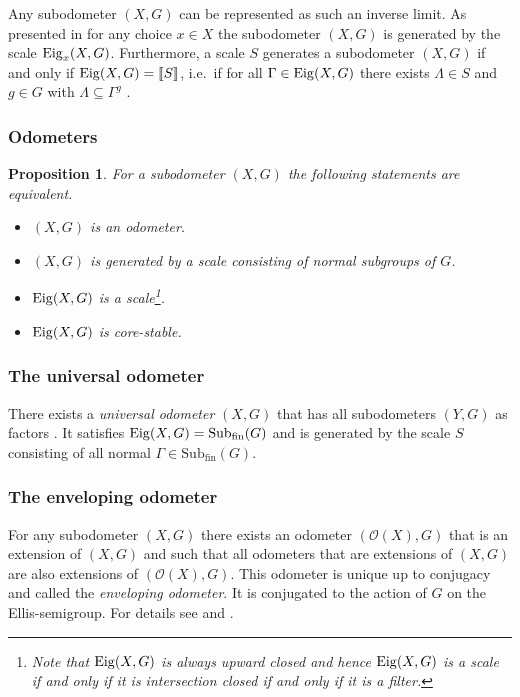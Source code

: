 \documentclass[12pt, reqno]{amsart}
\newtheorem{proposition}[theorem]{Proposition}
\theoremstyle{definition}
\theoremstyle{remark}
\numberwithin{equation}{section}
\theoremstyle{theorem}
\theoremstyle{remark}
\def\subfin{{\operatorname{Sub_{fin}}}}
\def\Eig{{\rm Eig}}
\newcommand{\envelopingOdometer}[1]{\mathcal{O}(#1)}
\newcommand{\eigenhull}[1]{\left\llbracket #1 \right\rrbracket}
\begin{document}
Any subodometer $(X,G)$ can be represented as such an inverse limit. 
As presented in \cite[Theorem~4.7]{cortez2026minimal} for any choice $x\in X$ the subodometer $(X,G)$ is generated by the scale $\Eig_x(X,G)$.
Furthermore, a scale $S$ generates a subodometer $(X,G)$ if and only if $\Eig(X,G)=\eigenhull{S}$, i.e.\ if for all $\Gamma\in \Eig(X,G)$ there exists $\Lambda\in S$ and $g\in G$ with $\Lambda\subseteq \Gamma^g$ \cite[Corollary~5.15]{cortez2026minimal}.

\subsubsection{Odometers}
\label{subsubsec:prelims_subodometers_Odometers}

\begin{proposition}\cite[Theorem~7.6]{cortez2026minimal}
\label{pro:odometerCharacterizationEIG}
    For a subodometer $(X,G)$ the following statements are equivalent. 
    \begin{itemize}
        \item[(i)] $(X,G)$ is an odometer. 
        \item[(ii)] $(X,G)$ is generated by a scale consisting of normal subgroups of $G$. 
        \item[(iii)] $\Eig(X,G)$ is a scale\footnote{Note that $\Eig(X,G)$ is always upward closed and hence $\Eig(X,G)$ is a scale if and only if it is intersection closed if and only if it is a filter.}.
        \item[(iv)] $\Eig(X,G)$ is core-stable.
    \end{itemize}
\end{proposition}

\subsubsection{The universal odometer}
\label{subsubsec:prelims_subodometers_TheUniversalOdometer}
There exists a \emph{universal odometer} $(X,G)$ that has all subodometers $(Y,G)$ as factors \cite[Section~9]{cortez2026minimal}. 
It satisfies $\Eig(X,G)=\subfin(G)$ and is generated by the scale $S$ consisting of all normal $\Gamma\in \subfin(G)$. 

\subsubsection{The enveloping odometer}
\label{subsubsec:prelims_subodometers_TheEnvelopingOdometer} 
For any subodometer $(X,G)$ there exists an odometer $(\envelopingOdometer{X},G)$ that is an extension of $(X,G)$ and such that all odometers that are extensions of $(X,G)$ are also extensions of $(\envelopingOdometer{X},G)$. 
This odometer is unique up to conjugacy and called the \emph{enveloping odometer}. It is conjugated to the action of $G$ on the Ellis-semigroup.  
For details see \cite[Section~9]{cortez2026minimal} and \cite[Chapter~3]{auslander1988minimal}. 
\end{document}
